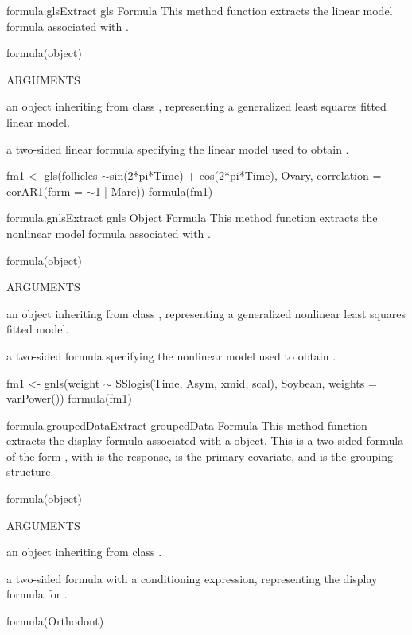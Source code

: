 \documentclass[pdftex]{article} \usepackage{url,graphicx}
\renewcommand{\Twiddle}{\mbox{\(\sim\)}}
\begin{document}
\begin{Helpfile}{formula.gls}{Extract gls Formula}
This method function extracts the linear model formula
associated with .
\begin{Example}
formula(object)
\end{Example}
\begin{Argument}{ARGUMENTS}
\item[\Co{object:}]
an object inheriting from class , representing
a generalized least squares fitted linear model.
\end{Argument}
a two-sided linear formula specifying the linear model used to
obtain .
\need 15pt
\vspace{-16pt} 
\begin{Example}
fm1 <- gls(follicles \Twiddle sin(2*pi*Time) + cos(2*pi*Time), Ovary,
           correlation = corAR1(form = \Twiddle 1 | Mare))
formula(fm1)
\end{Example}
\end{Helpfile}
\begin{Helpfile}{formula.gnls}{Extract gnls Object Formula}
This method function extracts the nonlinear model formula
associated with .
\begin{Example}
formula(object)
\end{Example}
\begin{Argument}{ARGUMENTS}
\item[\Co{object:}]
an object inheriting from class , representing
a generalized nonlinear least squares fitted model.
\end{Argument}
a two-sided formula specifying the nonlinear model used to
obtain .
\need 15pt
\vspace{-16pt}
\begin{Example}
fm1 <- gnls(weight {\Twiddle} SSlogis(Time, Asym, xmid, scal), Soybean,
            weights = varPower())
formula(fm1)
\end{Example}
\end{Helpfile}
\begin{Helpfile}{formula.groupedData}{Extract groupedData Formula}
This method function extracts the display formula associated with a
 object. This is a two-sided formula of the form
\Co{resp \Twiddle cov | group}, with  is the response,
 is the primary covariate, and  is the grouping
structure.
\begin{Example}
formula(object)
\end{Example}
\begin{Argument}{ARGUMENTS}
\item[\Co{object:}]
an object inheriting from class .
\end{Argument}
a two-sided formula with a conditioning expression, representing the
display formula for .
\need 15pt
\vspace{-16pt} 
\begin{Example}
formula(Orthodont)
\end{Example}
\end{Helpfile}
\end{document}
